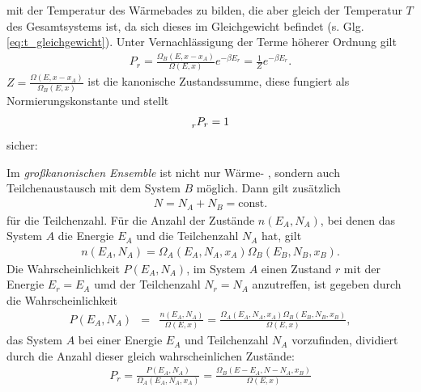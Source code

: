\documentclass{book}
\let\sum\relax
\DeclareMathOperator*{\sum}{\raisebox{-3.5pt}{\scalebox{2}{\rotatebox{1}{{\bask Σ}}}}}
\begin{document}
%
mit der Temperatur des Wärmebades zu bilden, die aber gleich der Temperatur $T$ des Gesamtsystems ist, da sich dieses im Gleichgewicht befindet (s. Glg. \eqref{eq:t_gleichgewicht}). Unter Vernachlässigung der Terme höherer Ordnung gilt
%
\begin{eqnarray}
P_r = \frac{\Omega_B\left(E, x - x_A\right)}{\Omega\left(E, x\right)}e^{-\beta E_r} = \frac{1}{Z}e^{-\beta E_r}.
\end{eqnarray}
%
$Z = \frac{\Omega\left(E, x - x_A\right)}{\Omega_B\left(E, x\right)}$ ist die kanonische Zustandssumme, diese fungiert als Normierungskonstante und stellt
%
\begin{eqnarray}
\sum_{r}^{}P_r = 1
\end{eqnarray}
%
sicher:
%
\begin{center}
\doublebox{\parbox{0.8\textwidth}{
\begin{center}
\begin{eqnarray}
Z = \sum_{r}^{}e^{-\beta E_r}\label{eq:kan_summe}
\end{eqnarray}
\end{center}
}}
\end{center}
%
Im \textit{großkanonischen Ensemble} ist nicht nur Wärme- , sondern auch Teilchenaustausch mit dem System $B$ möglich. Dann gilt zusätzlich
%
\begin{eqnarray}
N = N_A + N_B = \text{const}.
\end{eqnarray}
%
für die Teilchenzahl. Für die Anzahl der Zustände $n\left(E_A, N_A\right)$, bei denen das System $A$ die Energie $E_A$ und die Teilchenzahl $N_A$ hat, gilt
%
\begin{eqnarray}
n\left(E_A, N_A\right) = \Omega_A\left(E_A, N_A, x_A\right)\Omega_B\left(E_B, N_B, x_B\right).
\end{eqnarray}
%
Die Wahrscheinlichkeit $P\left(E_A, N_A\right)$, im System $A$ einen Zustand $r$ mit der Energie $E_r = E_A$ umd der Teilchenzahl $N_r = N_A$ anzutreffen, ist gegeben durch die Wahrscheinlichkeit
%
\begin{eqnarray}
P\left(E_A, N_A\right) & = & \frac{n\left(E_A, N_A\right)}{\Omega\left(E, x\right)} = \frac{\Omega_A\left(E_A, N_A, x_A\right)\Omega_B\left(E_B, N_B, x_B\right)}{\Omega\left(E, x\right)}, 
\end{eqnarray}
%
das System $A$ bei einer Energie $E_A$ und Teilchenzahl $N_A$ vorzufinden, dividiert durch die Anzahl dieser gleich wahrscheinlichen Zustände:
%
\begin{eqnarray}
P_r = \frac{P\left(E_A, N_A\right)}{\Omega_A\left(E_A, N_A, x_A\right)} = \frac{\Omega_B\left(E - E_A, N - N_A, x_B\right)}{\Omega\left(E, x\right)}
\end{eqnarray}
\end{document}
